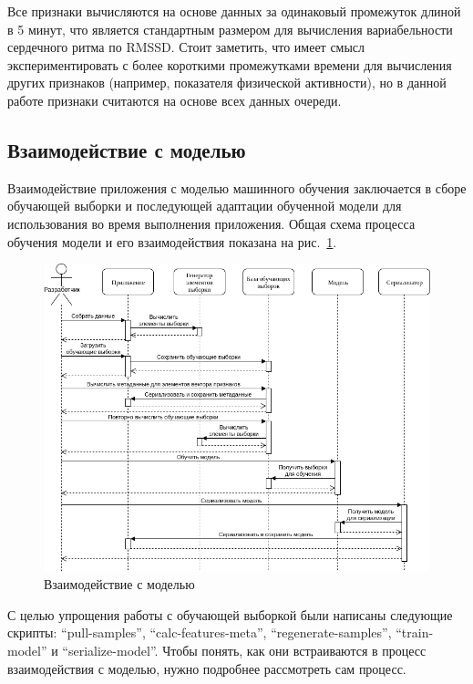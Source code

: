 \documentclass[14pt]{matmex-diploma-custom}
\begin{document}
Все признаки вычисляются на основе данных за одинаковый промежуток длиной в 5
минут, что является стандартным размером для вычисления вариабельности
сердечного ритма по RMSSD. Стоит заметить, что имеет смысл экспериментировать с
более короткими промежутками времени для вычисления других признаков (например,
показателя физической активности), но в данной работе признаки считаются на
основе всех данных очереди.

\subsection{Взаимодействие с моделью}
Взаимодействие приложения с моделью машинного обучения заключается в сборе
обучающей выборки и последующей адаптации обученной модели для использования во
время выполнения приложения. Общая схема процесса обучения модели и его
взаимодействия показана на рис.~\ref{fig:model_interaction}.

\begin{figure}[ht]
  \centering \includegraphics[width=\textwidth]{images/model_interaction.png}
  \caption{Взаимодействие с моделью}
  \label{fig:model_interaction}
\end{figure}

С целью упрощения работы с обучающей выборкой были написаны следующие скрипты:
``pull-samples'', ``calc-features-meta'', ``regenerate-samples'',
``train-model'' и ``serialize-model''. Чтобы понять, как они встраиваются в
процесс взаимодействия с моделью, нужно подробнее рассмотреть сам процесс.
\end{document}
